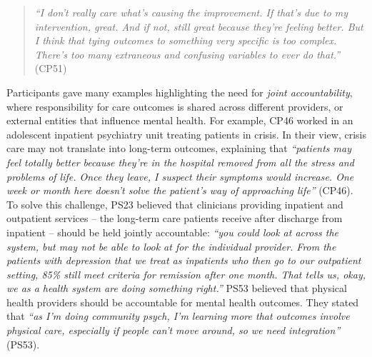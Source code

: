 \begin{quote}
    \textit{``I don't really care what's causing the improvement. 
    If that's due to my intervention, great. 
    And if not, still great because they're feeling better. 
    But I think that tying outcomes to something very specific is too complex. 
    There's too many extraneous and confusing variables to ever do that.''} (CP51)
\end{quote}

Participants gave many examples highlighting the need for \textit{joint accountability}, where responsibility for care outcomes is shared across different providers, or external entities that influence mental health.
For example, CP46 worked in an adolescent inpatient psychiatry unit treating patients in crisis. 
In their view, crisis care may not translate into long-term outcomes, explaining that \textit{``patients may feel totally better because they're in the hospital removed from all the stress and problems of life. Once they leave, I suspect their symptoms would increase. One week or month here doesn't solve the patient's way of approaching life''} (CP46).
To solve this challenge, PS23 believed that clinicians providing inpatient and outpatient services -- the long-term care patients receive after discharge from inpatient -- should be held jointly accountable: \textit{``you could look at across the system, but may not be able to look at for the individual provider. From the patients with depression that we treat as inpatients who then go to our outpatient setting, 85\% still meet criteria for remission after one month. That tells us, okay, we as a health system are doing something right.''}
PS53 believed that physical health providers should be accountable for mental health outcomes.
They stated that \textit{``as I'm doing community psych, I'm learning more that outcomes involve physical care, especially if people can't move around, so we need integration''} (PS53).

